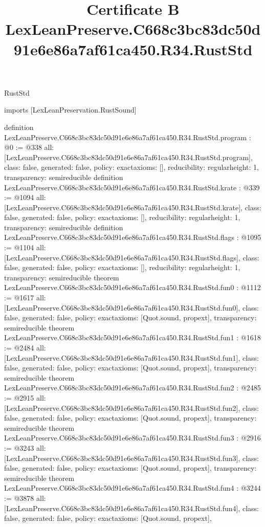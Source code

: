 \begin{lexlean}{RustStd}
\title{Certificate B LexLeanPreserve.C668c3bc83dc50d91e6e86a7af61ca450.R34.RustStd}
\begin{coremodule}
imports [LexLeanPreservation.RustSound]

definition LexLeanPreserve.C668c3bc83dc50d91e6e86a7af61ca450.R34.RustStd.program : @0 := @338 {
  all: [LexLeanPreserve.C668c3bc83dc50d91e6e86a7af61ca450.R34.RustStd.program],
  class: false,
  generated: false,
  policy: exact{axioms: []},
  reducibility: regular{height: 1},
  transparency: semireducible
}
definition LexLeanPreserve.C668c3bc83dc50d91e6e86a7af61ca450.R34.RustStd.krate : @339 := @1094 {
  all: [LexLeanPreserve.C668c3bc83dc50d91e6e86a7af61ca450.R34.RustStd.krate],
  class: false,
  generated: false,
  policy: exact{axioms: []},
  reducibility: regular{height: 1},
  transparency: semireducible
}
definition LexLeanPreserve.C668c3bc83dc50d91e6e86a7af61ca450.R34.RustStd.flags : @1095 := @1104 {
  all: [LexLeanPreserve.C668c3bc83dc50d91e6e86a7af61ca450.R34.RustStd.flags],
  class: false,
  generated: false,
  policy: exact{axioms: []},
  reducibility: regular{height: 1},
  transparency: semireducible
}
theorem LexLeanPreserve.C668c3bc83dc50d91e6e86a7af61ca450.R34.RustStd.fun0 : @1112 := @1617 {
  all: [LexLeanPreserve.C668c3bc83dc50d91e6e86a7af61ca450.R34.RustStd.fun0],
  class: false,
  generated: false,
  policy: exact{axioms: [Quot.sound, propext]},
  transparency: semireducible
}
theorem LexLeanPreserve.C668c3bc83dc50d91e6e86a7af61ca450.R34.RustStd.fun1 : @1618 := @2484 {
  all: [LexLeanPreserve.C668c3bc83dc50d91e6e86a7af61ca450.R34.RustStd.fun1],
  class: false,
  generated: false,
  policy: exact{axioms: [Quot.sound, propext]},
  transparency: semireducible
}
theorem LexLeanPreserve.C668c3bc83dc50d91e6e86a7af61ca450.R34.RustStd.fun2 : @2485 := @2915 {
  all: [LexLeanPreserve.C668c3bc83dc50d91e6e86a7af61ca450.R34.RustStd.fun2],
  class: false,
  generated: false,
  policy: exact{axioms: [Quot.sound, propext]},
  transparency: semireducible
}
theorem LexLeanPreserve.C668c3bc83dc50d91e6e86a7af61ca450.R34.RustStd.fun3 : @2916 := @3243 {
  all: [LexLeanPreserve.C668c3bc83dc50d91e6e86a7af61ca450.R34.RustStd.fun3],
  class: false,
  generated: false,
  policy: exact{axioms: [Quot.sound, propext]},
  transparency: semireducible
}
theorem LexLeanPreserve.C668c3bc83dc50d91e6e86a7af61ca450.R34.RustStd.fun4 : @3244 := @3878 {
  all: [LexLeanPreserve.C668c3bc83dc50d91e6e86a7af61ca450.R34.RustStd.fun4],
  class: false,
  generated: false,
  policy: exact{axioms: [Quot.sound, propext]},
}
\end{coremodule}
\end{lexlean}
